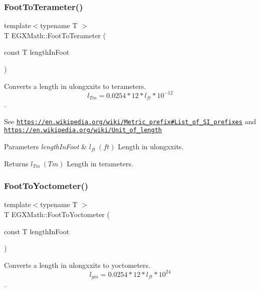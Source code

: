 \subsubsection{\texorpdfstring{Foot\+To\+Terameter()}{FootToTerameter()}}
{\footnotesize\ttfamily template$<$typename T $>$ \\
T E\+G\+X\+Math\+::\+Foot\+To\+Terameter (\begin{DoxyParamCaption}\item[{const T}]{length\+In\+Foot }\end{DoxyParamCaption})}



Converts a length in ulongxxits to terameters. \[ l_{Tm}=0.0254 * 12 * l_{ft} * 10^{-12} \]. 

See \href{https://en.wikipedia.org/wiki/Metric_prefix#List_of_SI_prefixes}{\tt https\+://en.\+wikipedia.\+org/wiki/\+Metric\+\_\+prefix\#\+List\+\_\+of\+\_\+\+S\+I\+\_\+prefixes} and \href{https://en.wikipedia.org/wiki/Unit_of_length}{\tt https\+://en.\+wikipedia.\+org/wiki/\+Unit\+\_\+of\+\_\+length} 
\begin{DoxyParams}{Parameters}
{\em length\+In\+Foot} & $ l_{ft}\ (ft)$ Length in ulongxxits. \\
\hline
\end{DoxyParams}
\begin{DoxyReturn}{Returns}
$ l_{Tm}\ (Tm)$ Length in terameters. 
\end{DoxyReturn}
\mbox{\label{group___e_g_x_math-_conversions-_length_conversions-_imperial-_foot-_s_i_ga6a04aa5a8be3bebe58307e334d433a40}} 
\subsubsection{\texorpdfstring{Foot\+To\+Yoctometer()}{FootToYoctometer()}}
{\footnotesize\ttfamily template$<$typename T $>$ \\
T E\+G\+X\+Math\+::\+Foot\+To\+Yoctometer (\begin{DoxyParamCaption}\item[{const T}]{length\+In\+Foot }\end{DoxyParamCaption})}



Converts a length in ulongxxits to yoctometers. \[ l_{ym}=0.0254 * 12 * l_{ft} * 10^{24} \]. 

